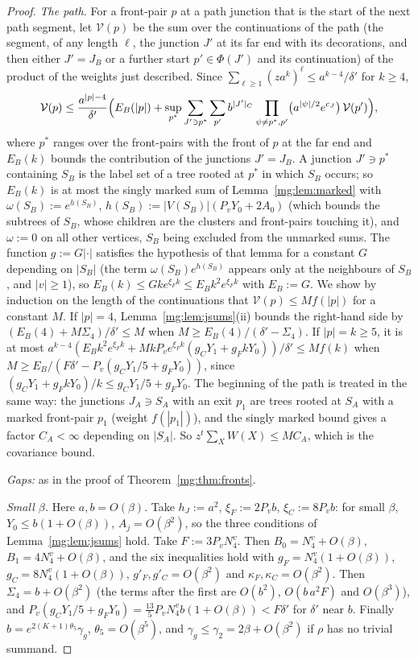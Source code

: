 \documentclass[11pt,a4paper]{article}
\theoremstyle{definition}
\theoremstyle{remark}
\begin{document}
\begin{proof}
\emph{The path.} For a front-pair $p$ at a path junction that is the start of the next path segment, let $\mathcal V(p)$ be the sum over the
continuations of the path (the segment, of any length $\ell$, the junction $J'$ at its far end with its decorations, and then either $J'=J_B$ or a further
start $p'\in\Phi(J')$ and its continuation) of the product of the weights just described. Since $\sum_{\ell\ge1}(za^{k})^\ell\le a^{k-4}/\delta'$ for $k\ge4$,
\[
\mathcal V(p)\le\frac{a^{|p|-4}}{\delta'}\Bigl(E_B(|p|)+\sup_{p^*}\sum_{J'\ni p^*}\sum_{p'}b^{|J'|_C}\prod_{\psi\ne p^*,p'}\bigl(a^{|\psi|/2}e^{c_J}\bigr)\,\mathcal V(p')\Bigr),
\]
where $p^*$ ranges over the front-pairs with the front of $p$ at the far end and $E_B(k)$ bounds the contribution of the junctions $J'=J_B$. A junction
$J'\ni p^*$ containing $S_B$ is the label set of a tree rooted at $p^*$ in which $S_B$ occurs; so $E_B(k)$ is at most the singly marked sum of
Lemma~\ref{mg:lem:marked} with $\omega(S_B):=e^{h(S_B)}$, $h(S_B):=|V(S_B)|(P_vY_0+2A_0)$ (which bounds the subtrees of $S_B$, whose children are the
clusters and front-pairs touching it), and $\omega:=0$ on all other vertices, $S_B$ being excluded from the unmarked sums. The function
$g:=G|\cdot|$ satisfies the hypothesis of that lemma for a constant $G$ depending on $|S_B|$ (the term $\omega(S_B)e^{h(S_B)}$ appears only at the
neighbours of $S_B$, and $|v|\ge1$), so $E_B(k)\le Gke^{\xi_Fk}\le E_Bk^2e^{\xi_Fk}$ with $E_B:=G$. We show by
induction on the length of the continuations that $\mathcal V(p)\le Mf(|p|)$ for a constant $M$. If $|p|=4$, Lemma~\ref{mg:lem:jsums}(ii) bounds the
right-hand side by $(E_B(4)+M\Sigma_4)/\delta'\le M$ when $M\ge E_B(4)/(\delta'-\Sigma_4)$. If $|p|=k\ge5$, it is at most
$a^{k-4}(E_Bk^2e^{\xi_Fk}+MkP_ve^{\xi_Fk}(g_CY_1+g_FkY_0))/\delta'\le Mf(k)$ when $M\ge E_B/(F\delta'-P_v(g_CY_1/5+g_FY_0))$, since
$(g_CY_1+g_FkY_0)/k\le g_CY_1/5+g_FY_0$. The beginning of the path is treated in the same way: the junctions $J_A\ni S_A$ with an exit $p_1$ are trees
rooted at $S_A$ with a marked front-pair $p_1$ (weight $f(|p_1|)$), and the singly marked bound gives a factor $C_A<\infty$ depending on $|S_A|$. So
$z^t\sum_XW(X)\le MC_A$, which is the covariance bound.

\emph{Gaps:} as in the proof of Theorem~\ref{mg:thm:fronts}.

\emph{Small $\beta$.} Here $a,b=O(\beta)$. Take $h_J:=a^2$, $\xi_F:=2P_vb$, $\xi_C:=8P_vb$: for small $\beta$, $Y_0\le b(1+O(\beta))$, $A_j=O(\beta^2)$, so
the three conditions of Lemma~\ref{mg:lem:jsums} hold. Take $F:=3P_vN^v_4$. Then $B_0=N^v_4+O(\beta)$, $B_1=4N^v_4+O(\beta)$, and the six
inequalities hold with $g_F=N^v_4(1+O(\beta))$, $g_C=8N^v_4(1+O(\beta))$, $g'_F,g'_C=O(\beta^2)$ and $\kappa_F,\kappa_C=O(\beta^2)$. Then
$\Sigma_4=b+O(\beta^2)$ (the terms after the first are $O(b^2)$, $O(b\,a^2F)$ and $O(\beta^3)$), and $P_v(g_CY_1/5+g_FY_0)=\frac{13}5P_vN^v_4b(1+O(\beta))<F\delta'$
for $\delta'$ near $b$. Finally $b=e^{2(K+1)\theta_5}\gamma_g$, $\theta_5=O(\beta^5)$, and $\gamma_g\le\gamma_2=2\beta+O(\beta^2)$ if $\rho$ has no trivial summand.
\end{proof}
\end{document}
